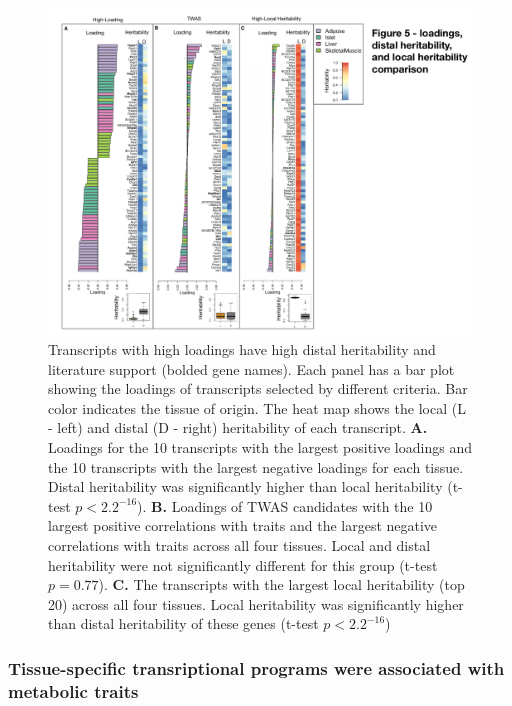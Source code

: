 \documentclass[
]{article}
\begin{document}
\begin{figure}[ht!]
\includegraphics[width=\textwidth]{Figures/Fig5_loading_heritability.pdf} 
\caption{Transcripts with high loadings have high distal heritability 
and literature support (bolded gene names). Each panel has a bar plot 
showing the loadings of transcripts selected by different criteria. Bar color indicates the 
tissue of origin. The heat map shows the local (L - left) and distal 
(D - right) heritability of each transcript. \textbf{A.} Loadings for 
the 10 transcripts with the largest positive loadings and the 10 
transcripts with the largest negative loadings for each tissue. 
Distal heritability was significantly higher than local heritability 
(t-test $p < 2.2^{-16}$). \textbf{B.} Loadings of TWAS candidates 
with the 10 largest positive correlations with traits and the largest 
negative correlations with traits across all four tissues. Local and 
distal heritability were not significantly different for this group 
(t-test $p = 0.77$). \textbf{C.} The transcripts with the largest 
local heritability (top 20) across all four tissues. Local heritability 
was significantly higher than distal heritability of these genes (t-test 
$p < 2.2^{-16}$)
}
\label{fig:loading_heritability}
\end{figure}

\subsubsection{Tissue-specific transriptional programs were associated
with metabolic
traits}\label{tissue-specific-transriptional-programs-were-associated-with-metabolic-traits}
\end{document}
